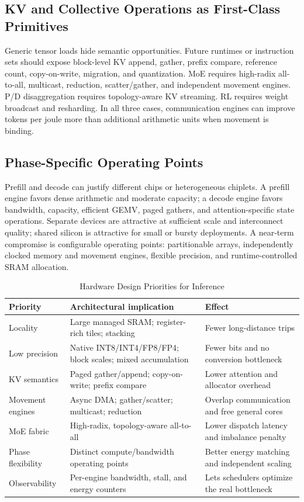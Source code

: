 \documentclass[journal]{IEEEtran}
\begin{document}
\subsection{KV and Collective Operations as First-Class Primitives}
Generic tensor loads hide semantic opportunities. Future runtimes or instruction sets should expose block-level KV append, gather, prefix compare, reference count, copy-on-write, migration, and quantization. MoE requires high-radix all-to-all, multicast, reduction, scatter/gather, and independent movement engines. P/D disaggregation requires topology-aware KV streaming. RL requires weight broadcast and resharding. In all three cases, communication engines can improve tokens per joule more than additional arithmetic units when movement is binding.

\subsection{Phase-Specific Operating Points}
Prefill and decode can justify different chips or heterogeneous chiplets. A prefill engine favors dense arithmetic and moderate capacity; a decode engine favors bandwidth, capacity, efficient GEMV, paged gathers, and attention-specific state operations. Separate devices are attractive at sufficient scale and interconnect quality; shared silicon is attractive for small or bursty deployments. A near-term compromise is configurable operating points: partitionable arrays, independently clocked memory and movement engines, flexible precision, and runtime-controlled SRAM allocation.

\begin{table}[t]
\caption{Hardware Design Priorities for Inference}
\label{tab:hardware}
\centering
\scriptsize
\begin{tabularx}{\columnwidth}{@{}p{}p{}X@{}}
\toprule
Priority & Architectural implication & Effect \\
\midrule
Locality & Large managed SRAM; register-rich tiles; stacking & Fewer long-distance trips \\
Low precision & Native INT8/INT4/FP8/FP4; block scales; mixed accumulation & Fewer bits and no conversion bottleneck \\
KV semantics & Paged gather/append; copy-on-write; prefix compare & Lower attention and allocator overhead \\
Movement engines & Async DMA; gather/scatter; multicast; reduction & Overlap communication and free general cores \\
MoE fabric & High-radix, topology-aware all-to-all & Lower dispatch latency and imbalance penalty \\
Phase flexibility & Distinct compute/bandwidth operating points & Better energy matching and independent scaling \\
Observability & Per-engine bandwidth, stall, and energy counters & Lets schedulers optimize the real bottleneck \\
\bottomrule
\end{tabularx}
\end{table}
\end{document}
